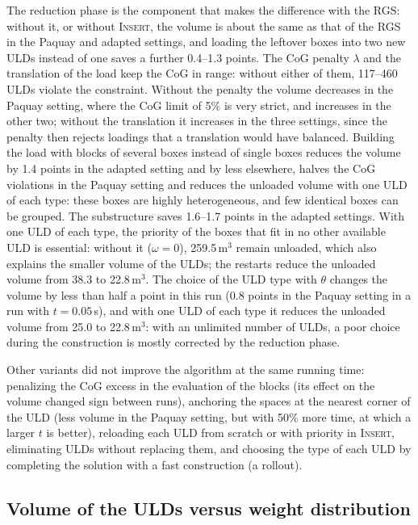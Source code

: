 The reduction phase is the component that makes the difference with the RGS: without it, or
without \textsc{Insert}, the volume is about the same as that of the RGS in the Paquay and adapted
settings, and loading the leftover boxes into two new ULDs instead of one saves a further
0.4--1.3 points. The CoG penalty $\lambda$ and the translation of the load keep the CoG in range:
without either of them, 117--460 ULDs violate the constraint. Without the penalty the volume
decreases in the Paquay setting, where the CoG limit of 5\% is very strict, and increases in the
other two; without the translation it increases in the three settings, since the penalty then
rejects loadings that a translation would have balanced. Building the load with blocks of
several boxes instead of single boxes reduces the volume by 1.4 points in the adapted setting and
by less elsewhere, halves the CoG violations in the Paquay setting and reduces the unloaded volume
with one ULD of each type: these boxes are highly heterogeneous, and few identical boxes can be
grouped. The substructure saves 1.6--1.7 points in the adapted settings. With one ULD of each type, the
priority of the boxes that fit in no other available ULD is essential: without it ($\omega = 0$),
259.5\,m$^3$ remain unloaded, which also explains the smaller volume of the ULDs; the restarts
reduce the unloaded volume from 38.3 to 22.8\,m$^3$. The choice of the ULD type with $\theta$
changes the volume by less than half a point in this run (0.8 points in the Paquay setting in a
run with $t = 0.05$\,s), and with one ULD of each type it reduces the unloaded volume from 25.0 to
22.8\,m$^3$: with an unlimited number of ULDs, a poor choice during the construction is mostly
corrected by the reduction phase.

Other variants did not improve the algorithm at the same running time: penalizing the CoG
excess in the evaluation of the blocks (its effect on the volume changed sign between runs),
anchoring the spaces at the nearest corner of the ULD (less volume in the Paquay setting, but
with 50\% more time, at which a larger $t$ is better), reloading each ULD from scratch or with
priority in \textsc{Insert}, eliminating ULDs without replacing them, and choosing the type of
each ULD by completing the solution with a fast construction (a rollout).

\subsection{Volume of the ULDs versus weight distribution}
\label{sec:exp-tradeoff}

